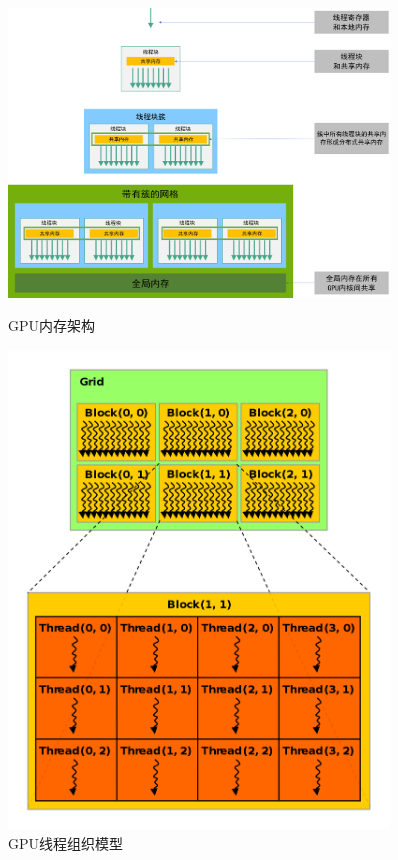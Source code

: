 \begin{figure}[htb]
    \centering
    \begin{minipage}[t]{0.55\textwidth}
    \centering
    \includegraphics[width=0.9\textwidth]{figures/memory_hierarchy.png}
    \caption{GPU内存架构}
    \label{fig:memory_hierarchy}
    \end{minipage}
    \begin{minipage}[t]{0.35\textwidth}
    \centering
    \includegraphics[width=0.9\textwidth]{figures/thread_block.png}
    \caption{GPU线程组织模型}
    \label{fig:block_thread}
    \end{minipage}
\end{figure}

